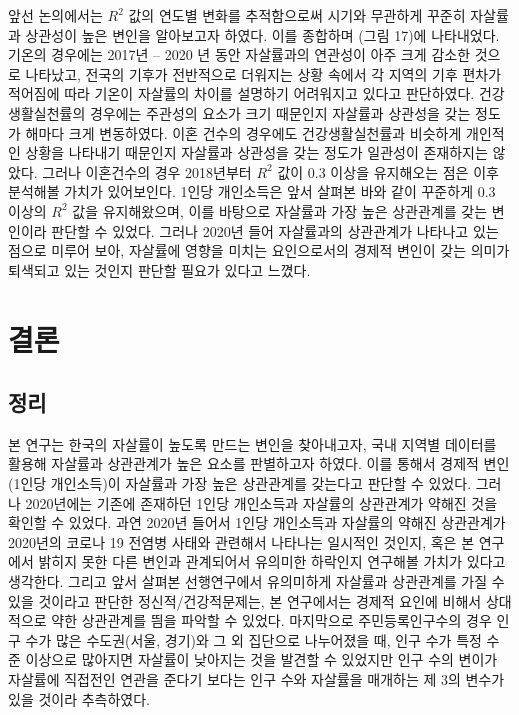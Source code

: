 \documentclass[a4paper, 11pt]{oblivoir}
\begin{document}
     앞선 논의에서는 $R^{2}$ 값의 연도별 변화를 추적함으로써 시기와 무관하게 꾸준히 자살률과 상관성이 높은 변인을 알아보고자 하였다. 이를 종합하며 (그림 17)에 나타내었다. 
    기온의 경우에는 2017년 – 2020 년 동안 자살률과의 
    연관성이 아주 크게 감소한 것으로 나타났고, 전국의 기후가 전반적으로 더워지는 상황 속에서 각 지역의 기후 편차가 적어짐에 따라 기온이 자살률의 차이를 설명하기 
    어려워지고 있다고 판단하였다. 건강생활실천률의 경우에는 주관성의 요소가 크기 때문인지 자살률과 상관성을 갖는 정도가 해마다 크게 변동하였다. 이혼 건수의 경우에도 건강생활실천률과
    비슷하게 개인적인 상황을 나타내기 때문인지 자살률과 상관성을 갖는 정도가 일관성이 존재하지는 않았다. 그러나 이혼건수의 경우 2018년부터 $R^{2}$ 값이 0.3 이상을 유지해오는 점은 
    이후 분석해볼 가치가 있어보인다. 1인당 개인소득은 앞서 살펴본 바와 같이 꾸준하게 0.3 이상의 $R^{2}$ 값을 유지해왔으며, 이를 바탕으로 자살률과 가장 높은
    상관관계를 갖는 변인이라 판단할 수 있었다. 그러나 2020년 들어 자살률과의 상관관계가 나타나고 있는 점으로 미루어 보아, 자살률에 영향을 미치는 요인으로서의 
    경제적 변인이 갖는 의미가 퇴색되고 있는 것인지 판단할 필요가 있다고 느꼈다.

    \section{결론}
    \subsection{정리}
    본 연구는 한국의 자살률이 높도록 만드는 변인을 찾아내고자, 국내 지역별 데이터를 활용해 자살률과 상관관계가 높은 요소를 판별하고자 
    하였다. 이를 통해서 경제적 변인(1인당 개인소득)이 자살률과 가장 높은 상관관계를 갖는다고 판단할 수 있었다. 그러나 2020년에는 기존에 
    존재하던 1인당 개인소득과 자살률의 상관관계가 약해진 것을 확인할 수 있었다. 과연 2020년 들어서 1인당 개인소득과 자살률의 약해진 상관관계가 2020년의 코로나 19
    전염병 사태와 관련해서 나타나는 일시적인 것인지, 혹은 본 연구에서 밝히지 못한 다른 변인과 관계되어서 유의미한 하락인지 연구해볼 가치가 있다고 
    생각한다. 그리고 앞서 살펴본 선행연구에서 유의미하게 자살률과 상관관계를 가질 수 있을 것이라고 판단한 정신적/건강적문제는, 본 연구에서는
    경제적 요인에 비해서 상대적으로 약한 상관관계를 띔을 파악할 수 있었다. 마지막으로 주민등록인구수의 경우 인구 수가 많은 수도권(서울, 경기)와 
    그 외 집단으로 나누어졌을 때, 인구 수가 특정 수준 이상으로 많아지면 자살률이 낮아지는 것을 발견할 수 있었지만 인구 수의 변이가 자살률에 
    직접전인 연관을 준다기 보다는 인구 수와 자살률을 매개하는 제 3의 변수가 있을 것이라 추측하였다. 
\end{document}
